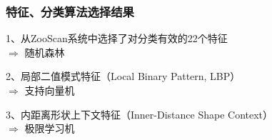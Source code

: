 \documentclass[notheorems,mathserif,table,compress]{beamer}  %
\begin{document}
\begin{frame}
 \frametitle{特征、分类算法选择结果 }
\begin{tcolorbox}[colback=blue!5,colframe=blue!75!black]
1、从ZooScan系统中选择了对分类有效的22个特征\\
$\Rightarrow$ 随机森林
\end{tcolorbox}
\begin{tcolorbox}[colback=blue!5,colframe=blue!75!black]
2、局部二值模式特征（Local Binary Pattern, LBP）\\
$\Rightarrow$ 支持向量机
\end{tcolorbox}
\begin{tcolorbox}[colback=blue!5,colframe=blue!75!black]
3、内距离形状上下文特征（Inner-Distance Shape Context）\\
$\Rightarrow$ 极限学习机
\end{tcolorbox}
\end{frame}
\end{document}
